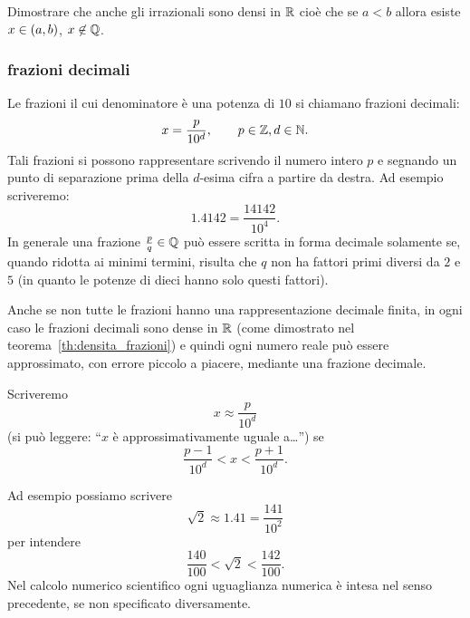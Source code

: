 \begin{exercise}\label{ex:densita_irrazionali}
  Dimostrare che anche gli irrazionali 
  sono densi in ${\mathbb R}$ cioè che se $a<b$ allora esiste 
  $x \in \left(a,b\right)$, $x\not \in {\mathbb Q}$.
\end{exercise}

\subsubsection{frazioni decimali}
%
Le frazioni il cui denominatore è una potenza
di $10$ si chiamano frazioni decimali:
\[
  x = \frac{p}{10^d}, \qquad p\in {\mathbb Z}, d\in {\mathbb N}.
\]
Tali frazioni si possono rappresentare
scrivendo il numero
intero $p$ e segnando un punto
%
di separazione
prima della $d$-esima cifra a partire da destra.
Ad esempio scriveremo:
\[
  1.4142 = \frac{14142}{10^4}.
\]
In generale una frazione $\frac{p}{q}\in {\mathbb Q}$
può essere scritta in forma decimale solamente
se, quando ridotta ai minimi termini,
risulta che $q$ non ha fattori primi diversi
da $2$ e $5$ (in quanto le potenze di dieci
hanno solo questi fattori).

Anche se non tutte le frazioni hanno una rappresentazione 
decimale finita, in ogni caso le frazioni decimali 
sono dense in ${\mathbb R}$ (come dimostrato nel teorema~\ref{th:densita_frazioni})
e quindi ogni numero reale può essere approssimato, con errore piccolo a piacere,
mediante una frazione decimale.

Scriveremo
\mymargin{$\approx$}%
\index{$\approx$}%
\[
  x \approx \frac{p}{10^d}
\]
(si può leggere: ``$x$ è approssimativamente uguale a\dots'')
se
\[
    \frac{p-1}{10^d} < x < \frac{p+1}{10^d}.
\]

Ad esempio possiamo scrivere
\[
  \sqrt 2 \approx 1.41 = \frac{141}{10^2}
\]
per intendere%
%
\begin{equation}\label{eq:approx_sqrt2}
\frac{140}{100} < \sqrt 2 < \frac{142}{100}.
\end{equation}
Nel calcolo numerico scientifico ogni uguaglianza numerica è intesa nel 
senso precedente, se non specificato diversamente. 

